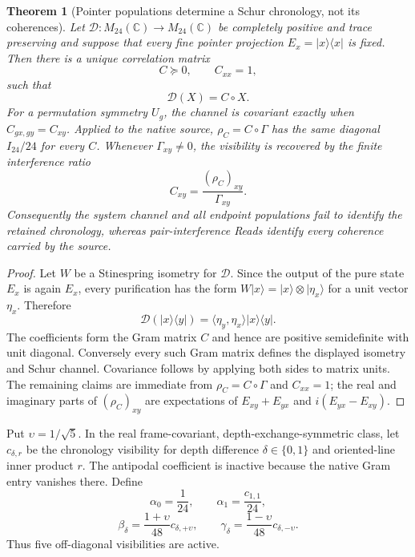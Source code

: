 \documentclass[11pt]{article}
\newtheorem{theorem}{Theorem}[section]
\theoremstyle{definition}
\theoremstyle{remark}
\newcommand{\C}{\mathbb C}
\begin{document}
\begin{theorem}[Pointer populations determine a Schur chronology, not its coherences]
\label{thm:pointer-chronology-master}
Let $\mathcal D:M_{24}(\C)\to M_{24}(\C)$ be completely positive and
trace preserving and suppose that every fine pointer projection
$E_x=|x\rangle\langle x|$ is fixed.  Then there is a unique correlation matrix
\[
 C\succeq0,\qquad C_{xx}=1,
\]
such that
\[
 \boxed{\mathcal D(X)=C\circ X.}
\]
For a permutation symmetry $U_g$, the channel is covariant exactly when
$C_{gx,gy}=C_{xy}$.  Applied to the native source,
$\rho_C=C\circ\Gamma$ has the same diagonal $I_{24}/24$ for every $C$.
Whenever $\Gamma_{xy}\ne0$, the visibility is recovered by the finite
interference ratio
\[
 \boxed{C_{xy}=\frac{(\rho_C)_{xy}}{\Gamma_{xy}}.}
\]
Consequently the system channel and all endpoint populations fail to identify
the retained chronology, whereas pair-interference Reads identify every
coherence carried by the source.
\end{theorem}

\begin{proof}
Let $W$ be a Stinespring isometry for $\mathcal D$.  Since the output of the
pure state $E_x$ is again $E_x$, every purification has the form
$W|x\rangle=|x\rangle\otimes|\eta_x\rangle$ for a unit vector $\eta_x$.
Therefore
\[
 \mathcal D(|x\rangle\langle y|)
 =\langle\eta_y,\eta_x\rangle|x\rangle\langle y|.
\]
The coefficients form the Gram matrix $C$ and hence are positive semidefinite
with unit diagonal.  Conversely every such Gram matrix defines the displayed
isometry and Schur channel.  Covariance follows by applying both sides to
matrix units.  The remaining claims are immediate from
$\rho_C=C\circ\Gamma$ and $C_{xx}=1$; the real and imaginary parts of
$(\rho_C)_{xy}$ are expectations of
$E_{xy}+E_{yx}$ and $i(E_{yx}-E_{xy})$.
\end{proof}

Put $\upsilon=1/\sqrt5$.  In the real frame-covariant, depth-exchange-symmetric
class, let $c_{\delta,r}$ be the chronology visibility for depth difference
$\delta\in\{0,1\}$ and oriented-line inner product $r$.  The antipodal
coefficient is inactive because the native Gram entry vanishes there.  Define
\[
 \alpha_0=\frac1{24},\qquad
 \alpha_1=\frac{c_{1,1}}{24},
\]
\[
 \beta_\delta=\frac{1+\upsilon}{48}c_{\delta,+\upsilon},
 \qquad
 \gamma_\delta=\frac{1-\upsilon}{48}c_{\delta,-\upsilon}.
\]
Thus five off-diagonal visibilities are active.
\end{document}
